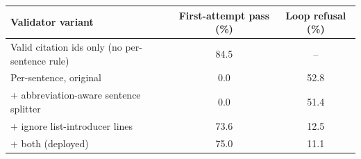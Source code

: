 \begin{tabular}{@{}lcc@{}}
\toprule
Validator variant & First-attempt pass (\%) & Loop refusal (\%) \\
\midrule
Valid citation ids only (no per-sentence rule) & 84.5 & -- \\
Per-sentence, original & 0.0 & 52.8 \\
\quad + abbreviation-aware sentence splitter & 0.0 & 51.4 \\
\quad + ignore list-introducer lines & 73.6 & 12.5 \\
\quad + both (deployed) & 75.0 & 11.1 \\
\bottomrule
\end{tabular}